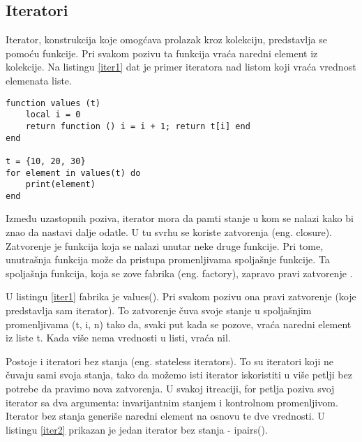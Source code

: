 \documentclass[a4paper]{article}
\begin{document}
\subsection{Iteratori}

Iterator, konstrukcija koje omogćava prolazak kroz kolekciju, predstavlja se pomoću funkcije. Pri svakom pozivu ta funkcija vraća naredni element iz kolekcije. Na listingu \ref{iter1} dat je primer iteratora nad listom koji vraća vrednost elemenata liste.

\begin{lstlisting}[caption={Primer iteratora nad listom},frame=single, label=iter1]
function values (t)
	local i = 0
	return function () i = i + 1; return t[i] end
end

t = {10, 20, 30}
for element in values(t) do
	print(element)
end
\end{lstlisting}

Između uzastopnih poziva, iterator mora da pamti stanje u kom se nalazi kako bi znao da nastavi dalje odatle. U tu svrhu se koriste zatvorenja (eng. closure). Zatvorenje je funkcija koja se nalazi unutar neke druge funkcije. Pri tome, unutrašnja funkcija može da pristupa promenljivama spoljašnje funkcije. Ta spoljašnja funkcija, koja se zove fabrika (eng. factory), zapravo pravi zatvorenje \cite{lua_org_iterators}.

U listingu \ref{iter1} fabrika je values(). Pri svakom pozivu ona pravi zatvorenje (koje predstavlja sam iterator). To zatvorenje čuva svoje stanje u spoljašnjim promenljivama (t, i, n) tako da, svaki put kada se pozove, vraća naredni element iz liste t. Kada više nema vrednosti u listi, vraća nil.

Postoje i iteratori bez stanja (eng. stateless iterators). To su iteratori koji ne čuvaju sami svoja stanja, tako da možemo isti iterator iskoristiti u više petlji bez potrebe da pravimo nova zatvorenja. U svakoj itreaciji, for petlja poziva svoj iterator sa dva argumenta: invarijantnim stanjem i kontrolnom promenljivom. Iterator bez stanja generiše naredni element na osnovu te dve vrednosti. U listingu \ref{iter2} prikazan je jedan iterator bez stanja - ipairs()\cite{bookProgInLua}.
\end{document}
